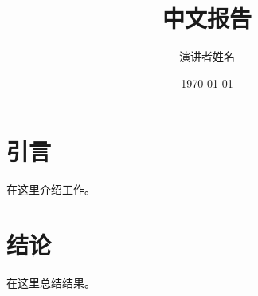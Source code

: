 \documentclass[12pt]{report}
\title{中文报告}
\author{演讲者姓名}
\date{\today}
\begin{document}
\maketitle
\tableofcontents

\chapter{引言}
在这里介绍工作。

\chapter{结论}
在这里总结结果。

% 
\end{document}
